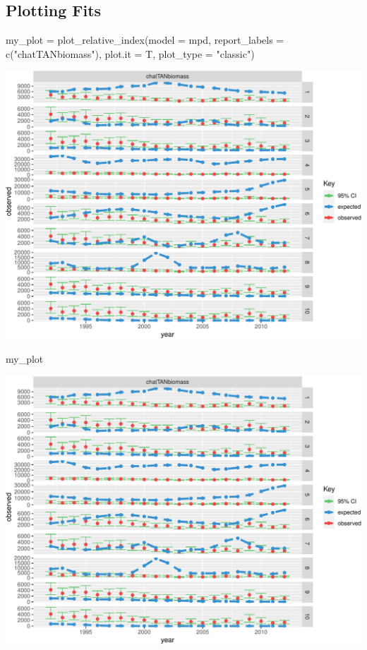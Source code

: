 \documentclass[
]{book}
\newenvironment{Shaded}{\begin{snugshade}}{\end{snugshade}}
\newcommand{\AttributeTok}[1]{\textcolor[rgb]{0.77,0.63,0.00}{#1}}
\newcommand{\FunctionTok}[1]{\textcolor[rgb]{0.00,0.00,0.00}{#1}}
\newcommand{\NormalTok}[1]{#1}
\newcommand{\OtherTok}[1]{\textcolor[rgb]{0.56,0.35,0.01}{#1}}
\newcommand{\StringTok}[1]{\textcolor[rgb]{0.31,0.60,0.02}{#1}}
\begin{document}
\hypertarget{plotting-fits-1}{%
\subsection*{Plotting Fits}\label{plotting-fits-1}}

\begin{Shaded}
\begin{Highlighting}[]
\NormalTok{my\_plot }\OtherTok{=} \FunctionTok{plot\_relative\_index}\NormalTok{(}\AttributeTok{model =}\NormalTok{ mpd, }\AttributeTok{report\_labels =} \FunctionTok{c}\NormalTok{(}\StringTok{"chatTANbiomass"}\NormalTok{), }\AttributeTok{plot.it =}\NormalTok{ T, }\AttributeTok{plot\_type =} \StringTok{"classic"}\NormalTok{)}
\end{Highlighting}
\end{Shaded}

\includegraphics{_main_files/figure-latex/plot_relative_index_multi-1.pdf}

\begin{Shaded}
\begin{Highlighting}[]
\NormalTok{my\_plot}
\end{Highlighting}
\end{Shaded}

\includegraphics{_main_files/figure-latex/plot_relative_index_multi-2.pdf}
\end{document}
